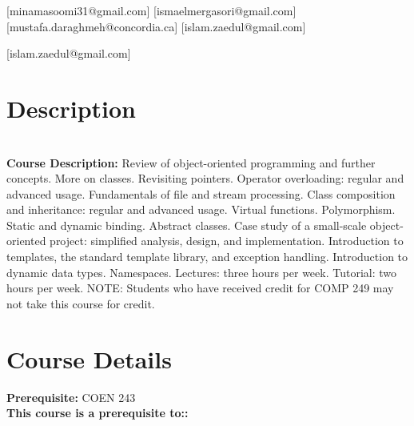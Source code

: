 \documentclass{CourseOutline}
\begin{document}
\maketitle
  

\vspace{10mm}

%
%

\begin{courseblock}
[minamasoomi31@gmail.com]
[ismaelmergasori@gmail.com]
[mustafa.daraghmeh@concordia.ca]
[islam.zaedul@gmail.com]\addtocounter{TutorialSection}{2}%
[islam.zaedul@gmail.com]
\end{courseblock}

\section{Description}
\textbf {\large \\ Course Description:} Review of object-oriented programming and further concepts. More on classes. Revisiting pointers. Operator overloading: regular and advanced usage. Fundamentals of file and stream processing. Class composition and inheritance: regular and advanced usage. Virtual functions. Polymorphism. Static and dynamic binding. Abstract classes. Case study of a small-scale object-oriented project: simplified analysis, design, and implementation. Introduction to templates, the standard template library, and exception handling. Introduction to dynamic data types. Namespaces. Lectures: three hours per week. Tutorial: two hours per week.
NOTE: Students who have received credit for COMP 249 may not take this course for credit.

\section{Course Details}

\textbf {Prerequisite:} COEN 243 \\

\textbf {This course is a prerequisite to::} \\
\end{document}
